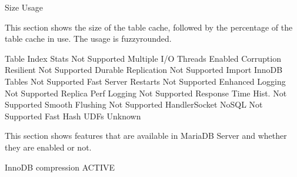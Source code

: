 \documentclass[letterpaper,10pt,english]{sphinxmanual}
\begin{document}
\begin{sphinxVerbatim}[commandchars=\\\{\}]
                     Size  
                    Usage  \PYGZpc{}
\end{sphinxVerbatim}

\sphinxAtStartPar
This section shows the size of the table cache, followed by the percentage of
the table cache in use. The usage is fuzzy\sphinxhyphen{}rounded.

\begin{sphinxVerbatim}[commandchars=\\\{\}]
      Table  Index Stats  Not Supported
     Multiple I/O Threads  Enabled
     Corruption Resilient  Not Supported
      Durable Replication  Not Supported
     Import InnoDB Tables  Not Supported
     Fast Server Restarts  Not Supported
         Enhanced Logging  Not Supported
     Replica Perf Logging  Not Supported
      Response Time Hist.  Not Supported
          Smooth Flushing  Not Supported
      HandlerSocket NoSQL  Not Supported
           Fast Hash UDFs  Unknown
\end{sphinxVerbatim}

\sphinxAtStartPar
This section shows features that are available in MariaDB Server and whether
they are enabled or not.

\begin{sphinxVerbatim}[commandchars=\\\{\}]
       InnoDB compression  ACTIVE
\end{sphinxVerbatim}
\end{document}
